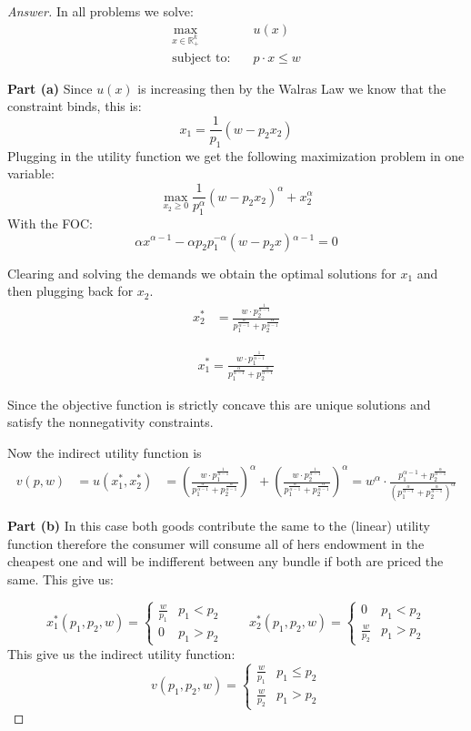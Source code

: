 \documentclass{article}
\theoremstyle{definition}
\begin{document}
\begin{proof}[Answer]
In all problems we solve:
\begin{align*}
\max_{x\in \mathbb{R}^k_+}&\quad u(x)\\
\text{subject to:} &\quad p\cdot x \leq w
\end{align*}

\textbf{Part (a)}
Since $u(x)$ is increasing then by the Walras Law we know that the constraint binds, this is:
$$x_1 = \frac{1}{p_1}(w-p_2x_2)$$
Plugging in the utility function we get the following maximization problem in one variable:
$$\max_{x_2\geq0} \frac{1}{p_1^\alpha}(w-p_2x_2)^\alpha + x_2^\alpha$$
With the FOC:
$$\alpha  x^{\alpha -1}-\alpha 
   p_2 p_1^{-\alpha }
   \left(w-p_2
   x\right){}^{\alpha -1}=0$$

Clearing and solving the demands we obtain the optimal solutions for $x_1$ and then plugging back for  $x_2$.
\begin{align*}
 x_2^*& = \frac{w\cdot p_2^\frac{1}{\alpha -1}}{p_1^\frac{\alpha}{\alpha -1}+p_2^\frac{\alpha}{\alpha -1}}
\end{align*}

\begin{align*}
    x_1^* = \frac{w\cdot p_1^\frac{1}{\alpha -1}}{p_1^\frac{\alpha}{\alpha -1}+p_2^\frac{\alpha}{\alpha -1}}
\end{align*}

Since the objective function is strictly concave this are unique solutions and satisfy the nonnegativity constraints.

Now the indirect utility function is 
$$
\begin{aligned}
v(p, w)&=u\left(x_{1}^*, x_{2}^*\right) &=\left( \frac{w\cdot p_{1}^{\frac{1}{\alpha-1}}}{p_{1}^{\frac{\alpha}{\alpha-1}}+p_{2}^{\frac{\alpha}{\alpha-1}}}\right)^{\alpha}+\left( \frac{w\cdot p_{2}^{\frac{1}{\alpha-1}}}{p_{1}^{\frac{\alpha}{\alpha-1}}+p_{2}^{\frac{\alpha}{\alpha-1}}}\right)^{\alpha} =w^{\alpha} \cdot\frac{p_{1}^{\alpha-1}+p_{2}^{\frac{\alpha}{\alpha-1}}}{\left(p_{1}^{\frac{\alpha}{\alpha-1}}+p_{2}^{\frac{\alpha}{\alpha-1}}\right)^{\alpha}}
\end{aligned}
$$

\textbf{Part (b)}
In this case both goods contribute the same to the (linear) utility function therefore the consumer will consume all of hers endowment in the cheapest one and will be indifferent between any bundle if both are priced the same. This give us:

$$x_1^*(p_1,p_2,w) = \left \{ \begin{array}{cc}
     \frac{w}{p_1}&  p_1 < p_2\\
     0 & p_1 > p_2
\end{array} \qquad x_2^*(p_1,p_2,w) = \left \{ \begin{array}{cc}
     0&  p_1 < p_2\\
    \frac{w}{p_2} & p_1 > p_2
\end{array}$$ 
This give us the indirect utility function:
$$v(p_1,p_2,w) = \left \{ \begin{array}{cc}
     \frac{w}{p_1}&  p_1 \leq p_2\\
     \frac{w}{p_2} & p_1 > p_2
\end{array}$$


\end{proof}
\end{document}
